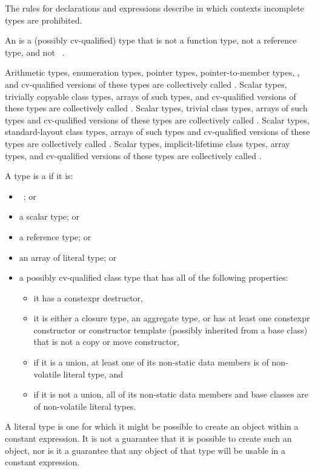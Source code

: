 \pnum
\begin{note}
The rules for declarations and expressions describe in which
contexts incomplete types are prohibited.
\end{note}

\pnum
An  is a (possibly cv-qualified) type that is not
a function type, not a reference type, and not \cv{}~.

\pnum
{}%
%
%
Arithmetic types, enumeration types,
pointer types, pointer-to-member types,
,
and
cv-qualified versions of these
types are collectively called
.
Scalar types, trivially copyable class types,
arrays of such types, and cv-qualified versions of these
types are collectively called .
Scalar types, trivial class types,
arrays of such types and cv-qualified versions of these
types are collectively called
. Scalar types, standard-layout class
types, arrays of such types and
cv-qualified versions of these types
are collectively called .
Scalar types, implicit-lifetime class types,
array types, and cv-qualified versions of these types
are collectively called .

\pnum
A type is a  if it is:
\begin{itemize}
\item \cv{}~; or
\item a scalar type; or
\item a reference type; or
\item an array of literal type; or
\item a possibly cv-qualified class type that
has all of the following properties:
\begin{itemize}
\item it has a constexpr destructor,
\item it is either a closure type,
an aggregate type, or
has at least one constexpr constructor or constructor template
(possibly inherited from a base class)
that is not a copy or move constructor,
\item if it is a union, at least one of its non-static data members is
of non-volatile literal type, and
\item if it is not a union, all of its non-static data members and base classes are
of non-volatile literal types.
\end{itemize}
\end{itemize}
\begin{note}
A literal type is one for which
it might be possible to create an object
within a constant expression.
It is not a guarantee that it is possible to create such an object,
nor is it a guarantee that any object of that type
will be usable in a constant expression.
\end{note}

